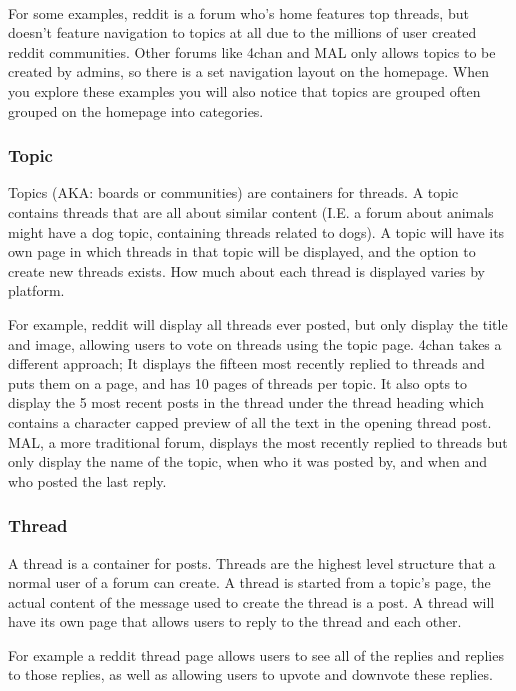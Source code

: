 \documentclass[]{article}
\begin{document}
\paragraph{}
For some examples, reddit is a forum who's home features top threads, but doesn't feature navigation to topics at all due to the millions of user created reddit communities. Other forums like 4chan and MAL only allows topics to be created by admins, so there is a set navigation layout on the homepage. When you explore these examples you will also notice that topics are grouped often grouped on the homepage into categories. 

\subsubsection{Topic}
Topics (AKA: boards or communities) are containers for threads. A topic contains threads that are all about similar content (I.E. a forum about animals might have a dog topic, containing threads related to dogs). A topic will have its own page in which threads in that topic will be displayed, and the option to create new threads exists. How much about each thread is displayed varies by platform.

For example, reddit will display all threads ever posted, but only display the title and image, allowing users to vote on threads using the topic page. 4chan takes a different approach; It displays the fifteen most recently replied to threads and puts them on a page, and has 10 pages of threads per topic. It also opts to display the 5 most recent posts in the thread under the thread heading which contains a character capped preview of all the text in the opening thread post. MAL, a more traditional forum, displays the most recently replied to threads but only display the name of the topic, when who it was posted by, and when and who posted the last reply. 

\subsubsection{Thread}
A thread is a container for posts. Threads are the highest level structure that a normal user of a forum can create. A thread is started from a topic's page, the actual content of the message used to create the thread is a post. A thread will have its own page that allows users to reply to the thread and each other.

For example a reddit thread page allows users to see all of the replies and replies to those replies, as well as allowing users to upvote and downvote these replies. 
\end{document}
